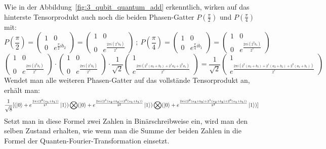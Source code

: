 Wie in der Abbildung~\ref*{fig:3_qubit_quantum_add} erkenntlich,
wirken auf das hinterste Tensorprodukt auch noch die beiden Phasen-Gatter \(P(\frac{\pi}{2})\) und \(P(\frac{\pi}{4})\) mit:
\[
    P(\frac{\pi}{2}) = 
\begin{pmatrix}
    1 & 0 \\
    0 & e^{\frac{\pi}{2} i b_2}
  \end{pmatrix}
  =
  \begin{pmatrix}
    1 & 0 \\
    0 & e^{\frac{2\pi i (2^1b_2)}{2^3}}
  \end{pmatrix}
  ~;~
P(\frac{\pi}{4}) = 
\begin{pmatrix}
    1 & 0 \\
    0 & e^{\frac{\pi}{4} i b_1}
  \end{pmatrix}
  =
  \begin{pmatrix}
    1 & 0 \\
    0 & e^{\frac{2\pi i (2^0b_1)}{2^3}}
  \end{pmatrix}
\]
\[
    \begin{pmatrix}
        1 & 0 \\
        0 & e^{\frac{2\pi i (2^0b_1)}{2^3}}
      \end{pmatrix}
      \cdot
      \begin{pmatrix}
        1 & 0 \\
        0 & e^{\frac{2\pi i (2^1b_2)}{2^3}}
      \end{pmatrix}
      \cdot
      \frac{1}{\sqrt{2}}
      \begin{pmatrix}
        1  \\
         e^{\frac{2 \pi i (2^{2}(a_3+b_3) +2^1a_2+2^0a_1)}{2^3}}
      \end{pmatrix}
      =
      \frac{1}{\sqrt{2}}
      \begin{pmatrix}
        1  \\
         e^{\frac{2 \pi i (2^{2}(a_3+b_3) +2^1(a_2+b_2)+2^0(a_1+b_1))}{2^3}}
      \end{pmatrix}
\]
Wendet man alle weiteren Phasen-Gatter auf das vollstände Tensorprodukt an, 
erhält man:
\[
    \frac{1}{\sqrt{8}} [ (\ket{0} + { e^{\frac{2 \pi i (2^0(a_1+b_1))}{2^1}}}\ket{1} ) \operatorname{\bigotimes}
( \ket{0} + { e^{\frac{2 \pi i (2^1(a_2+b_2)+2^0(a_1+b_1))}{2^2}}}\ket{1} ) \operatorname{\bigotimes}
( \ket{0} + { e^{\frac{2 \pi i (2^{2}(a_3+b_3) +2^1(a_2+b_2)+2^0(a_1+b_1))}{2^3}}}\ket{1} ) ]
\]
Setzt man in diese Formel zwei Zahlen in Binärschreibweise ein, 
wird man den selben Zustand erhalten,
wie wenn man die Summe der beiden Zahlen in die Formel der Quanten-Fourier-Transformation einsetzt.
